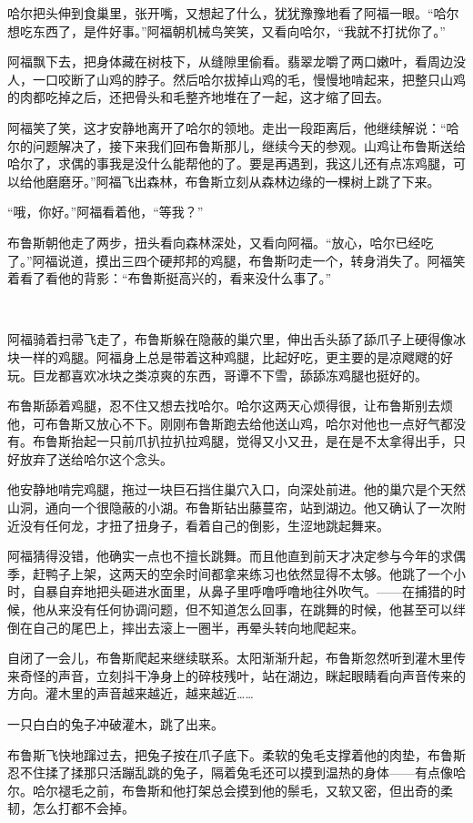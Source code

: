 \documentclass[../main.tex]{subfiles}
\begin{document}
哈尔把头伸到食巢里，张开嘴，又想起了什么，犹犹豫豫地看了阿福一眼。“哈尔想吃东西了，是件好事。”阿福朝机械鸟笑笑，又看向哈尔，“我就不打扰你了。”

阿福飘下去，把身体藏在树枝下，从缝隙里偷看。翡翠龙嚼了两口嫩叶，看周边没人，一口咬断了山鸡的脖子。然后哈尔拔掉山鸡的毛，慢慢地啃起来，把整只山鸡的肉都吃掉之后，还把骨头和毛整齐地堆在了一起，这才缩了回去。

阿福笑了笑，这才安静地离开了哈尔的领地。走出一段距离后，他继续解说：“哈尔的问题解决了，接下来我们回布鲁斯那儿，继续今天的参观。山鸡让布鲁斯送给哈尔了，求偶的事我是没什么能帮他的了。要是再遇到，我这儿还有点冻鸡腿，可以给他磨磨牙。”阿福飞出森林，布鲁斯立刻从森林边缘的一棵树上跳了下来。

“哦，你好。”阿福看着他，“等我？”

布鲁斯朝他走了两步，扭头看向森林深处，又看向阿福。“放心，哈尔已经吃了。”阿福说道，摸出三四个硬邦邦的鸡腿，布鲁斯叼走一个，转身消失了。阿福笑着看了看他的背影：“布鲁斯挺高兴的，看来没什么事了。”

~\

阿福骑着扫帚飞走了，布鲁斯躲在隐蔽的巢穴里，伸出舌头舔了舔爪子上硬得像冰块一样的鸡腿。阿福身上总是带着这种鸡腿，比起好吃，更主要的是凉飕飕的好玩。巨龙都喜欢冰块之类凉爽的东西，哥谭不下雪，舔舔冻鸡腿也挺好的。

布鲁斯舔着鸡腿，忍不住又想去找哈尔。哈尔这两天心烦得很，让布鲁斯别去烦他，可布鲁斯又放心不下。刚刚布鲁斯跑去给他送山鸡，哈尔对他也一点好气都没有。布鲁斯抬起一只前爪扒拉扒拉鸡腿，觉得又小又丑，是在是不太拿得出手，只好放弃了送给哈尔这个念头。

他安静地啃完鸡腿，拖过一块巨石挡住巢穴入口，向深处前进。他的巢穴是个天然山洞，通向一个很隐蔽的小湖。布鲁斯钻出藤蔓帘，站到湖边。他又确认了一次附近没有任何龙，才扭了扭身子，看着自己的倒影，生涩地跳起舞来。

阿福猜得没错，他确实一点也不擅长跳舞。而且他直到前天才决定参与今年的求偶季，赶鸭子上架，这两天的空余时间都拿来练习也依然显得不太够。他跳了一个小时，自暴自弃地把头砸进水面里，从鼻子里呼噜呼噜地往外吹气。——在捕猎的时候，他从来没有任何协调问题，但不知道怎么回事，在跳舞的时候，他甚至可以绊倒在自己的尾巴上，摔出去滚上一圈半，再晕头转向地爬起来。

自闭了一会儿，布鲁斯爬起来继续联系。太阳渐渐升起，布鲁斯忽然听到灌木里传来奇怪的声音，立刻抖干净身上的碎枝残叶，站在湖边，眯起眼睛看向声音传来的方向。灌木里的声音越来越近，越来越近……{}

一只白白的兔子冲破灌木，跳了出来。

布鲁斯飞快地蹿过去，把兔子按在爪子底下。柔软的兔毛支撑着他的肉垫，布鲁斯忍不住揉了揉那只活蹦乱跳的兔子，隔着兔毛还可以摸到温热的身体——有点像哈尔。哈尔褪毛之前，布鲁斯和他打架总会摸到他的鬃毛，又软又密，但出奇的柔韧，怎么打都不会掉。
\end{document}
